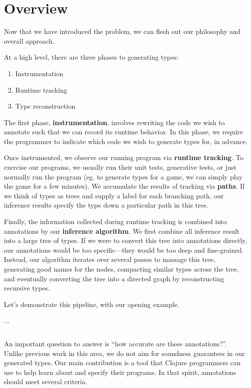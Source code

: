 \section{Overview}

Now that we have introduced the problem,
we can flesh out our philosophy and overall
approach.

At a high level, there are three phases to
generating types:

\begin{enumerate}
  \item Instrumentation
  \item Runtime tracking
  \item Type reconstruction
\end{enumerate}

The first phase, \textbf{instrumentation}, involves
rewriting the code we wish to annotate such
that we can record its runtime behavior.
In this phase, we require the programmer to
indicate which code we wish to generate types
for, in advance.

Once instrumented, we observe our running program
via \textbf{runtime tracking}. To exercise our programs,
we usually run their unit tests, generative tests,
or just normally run the program (eg. to generate types for
a game, we can simply play the game for a few minutes).
We accumulate the results of tracking via \textbf{paths}.
If we think of types as trees and supply a label
for each branching path, our inference results
specify the type down a particular path in this tree.

Finally, the information collected during runtime tracking
is combined into annotations by our \textbf{inference algorithm}.
We first combine all inference result into a large tree of
types. If we were to convert this tree into annotations directly,
our annotations would be too specific---they would be too
deep and fine-grained.
Instead, our algorithm iterates over several passes to massage
this tree, generating good names for the nodes, compacting similar
types across the tree, and
eventually converting the tree into a directed graph by reconstructing
recursive types.

Let's demonstrate this pipeline, with our opening example.

...

\begin{verbatim}

\end{verbatim}

An important question to answer is ``how accurate are these annotations?''.
Unlike previous work in this area, we do not aim for soundness guarantees
in our generated types. 
Our main contribution is a tool that Clojure programmers
can use to help learn about and specify their programs.
In that spirit, annotations should meet several criteria.

